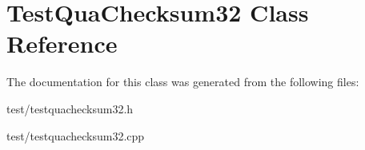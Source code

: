 \section{TestQuaChecksum32 Class Reference}
\label{classTestQuaChecksum32}


The documentation for this class was generated from the following files:\begin{DoxyCompactItemize}
\item 
test/testquachecksum32.h\item 
test/testquachecksum32.cpp\end{DoxyCompactItemize}
